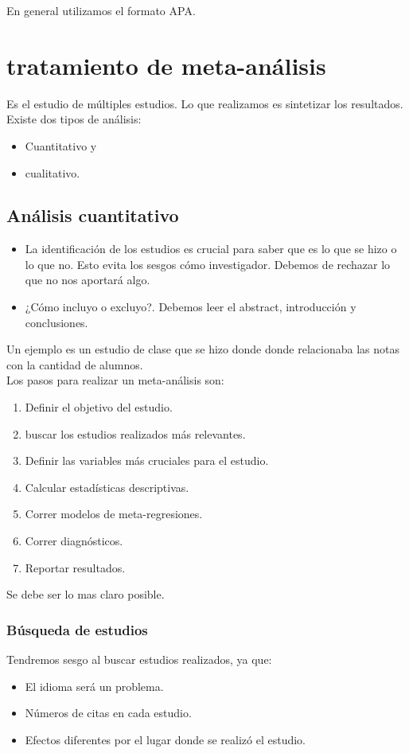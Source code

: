 En general utilizamos el formato APA.


\chapter{tratamiento de meta-análisis}
Es el estudio de múltiples estudios. Lo que realizamos es sintetizar los resultados.\\

Existe dos tipos de análisis:
\begin{itemize}
    \item Cuantitativo y
    \item cualitativo.
\end{itemize}

\section{Análisis cuantitativo}

\begin{itemize}
    \item La identificación de los estudios es crucial para saber que es lo que se hizo o lo que no. Esto evita los sesgos cómo investigador. Debemos de rechazar lo que no nos aportará algo.
    \item ¿Cómo incluyo o excluyo?. Debemos leer el abstract, introducción y conclusiones.
\end{itemize}

Un ejemplo es un estudio de clase que se hizo donde donde relacionaba las notas con la cantidad de alumnos.\\

Los pasos para realizar un meta-análisis son:
\begin{enumerate}[1.]
    \item Definir el objetivo del estudio.
    \item buscar los estudios realizados más relevantes.
    \item Definir las variables más cruciales para el estudio.
    \item Calcular estadísticas descriptivas.
    \item Correr modelos de meta-regresiones.
    \item Correr diagnósticos.
    \item Reportar resultados.
\end{enumerate}

Se debe ser lo mas claro posible.

\subsection{Búsqueda de estudios}
Tendremos sesgo al buscar estudios realizados, ya que:
\begin{itemize}
    \item El idioma será un problema.
    \item Números de citas en cada estudio.
    \item Efectos diferentes por el lugar donde se realizó el estudio.
\end{itemize}

